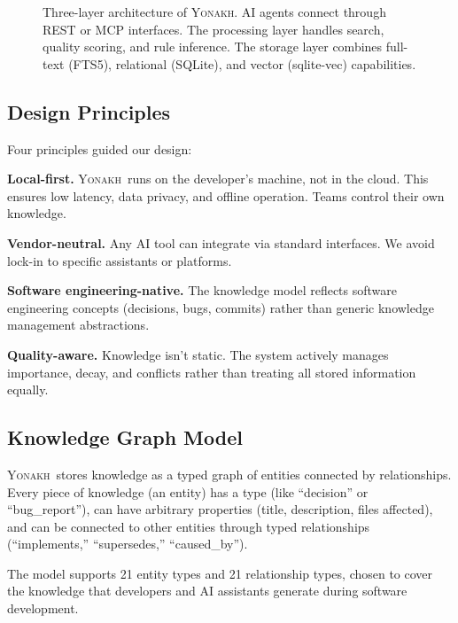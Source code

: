 \documentclass[10pt,journal,compsoc]{IEEEtran}
\newcommand{\yonakh}{\textsc{Yonakh}}
\begin{document}
\begin{figure}[t]
\caption{Three-layer architecture of \yonakh. AI agents connect through REST or MCP interfaces. The processing layer handles search, quality scoring, and rule inference. The storage layer combines full-text (FTS5), relational (SQLite), and vector (sqlite-vec) capabilities.}
\label{fig:architecture}
\end{figure}

\subsection{Design Principles}

Four principles guided our design:

\textbf{Local-first.} \yonakh\ runs on the developer's machine, not in the cloud. This ensures low latency, data privacy, and offline operation. Teams control their own knowledge.

\textbf{Vendor-neutral.} Any AI tool can integrate via standard interfaces. We avoid lock-in to specific assistants or platforms.

\textbf{Software engineering-native.} The knowledge model reflects software engineering concepts (decisions, bugs, commits) rather than generic knowledge management abstractions.

\textbf{Quality-aware.} Knowledge isn't static. The system actively manages importance, decay, and conflicts rather than treating all stored information equally.

\subsection{Knowledge Graph Model}

\yonakh\ stores knowledge as a typed graph of entities connected by relationships. Every piece of knowledge (an entity) has a type (like ``decision'' or ``bug\_report''), can have arbitrary properties (title, description, files affected), and can be connected to other entities through typed relationships (``implements,'' ``supersedes,'' ``caused\_by'').

The model supports 21 entity types and 21 relationship types, chosen to cover the knowledge that developers and AI assistants generate during software development.
\end{document}
